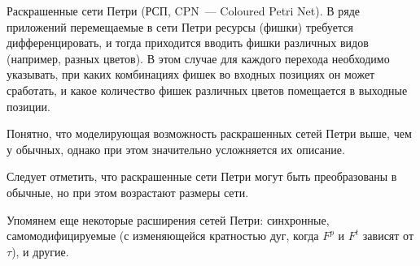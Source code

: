 Раскрашенные сети Петри (РСП, CPN~--- Coloured Petri Net). В ряде приложений перемещаемые в сети Петри ресурсы (фишки) требуется дифференцировать, и тогда
приходится вводить фишки различных видов (например, разных цветов). В этом случае для каждого перехода необходимо указывать, при каких комбинациях фишек во входных позициях он может сработать, и какое количество фишек различных цветов помещается в выходные позиции.

Понятно, что моделирующая возможность раскрашенных сетей Петри выше, чем у обычных, однако при этом значительно усложняется их описание.

Следует отметить, что раскрашенные сети Петри могут быть преобразованы в обычные, но при этом возрастают размеры сети.

Упомянем еще некоторые расширения сетей Петри: синхронные, самомодифицируемые (с изменяющейся кратностью дуг, когда $F^p$ и $F^t$ зависят от $\tau$), и другие.